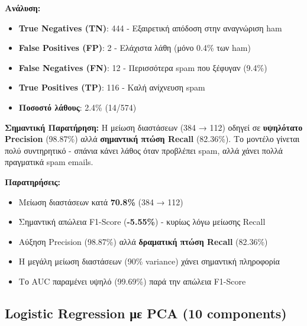\documentclass[12pt,a4paper,twoside]{book}
\begin{document}
\textbf{Ανάλυση:}
\begin{itemize}
    \item \textbf{True Negatives (TN)}: 444 - Εξαιρετική απόδοση στην αναγνώριση ham
    \item \textbf{False Positives (FP)}: 2 - Ελάχιστα λάθη (μόνο 0.4\% των ham)
    \item \textbf{False Negatives (FN)}: 12 - Περισσότερα spam που ξέφυγαν (9.4\%)
    \item \textbf{True Positives (TP)}: 116 - Καλή ανίχνευση spam
    \item \textbf{Ποσοστό λάθους}: 2.4\% (14/574)
\end{itemize}

\textbf{Σημαντική Παρατήρηση:} Η μείωση διαστάσεων (384 → 112) οδηγεί σε \textbf{υψηλότατο Precision} (98.87\%) αλλά \textbf{σημαντική πτώση Recall} (82.36\%). Το μοντέλο γίνεται πολύ συντηρητικό - σπάνια κάνει λάθος όταν προβλέπει spam, αλλά χάνει πολλά πραγματικά spam emails.

\textbf{Παρατηρήσεις:}
\begin{itemize}
    \item Μείωση διαστάσεων κατά \textbf{70.8\%} (384 → 112)
    \item Σημαντική απώλεια F1-Score (\textbf{-5.55\%}) - κυρίως λόγω μείωσης Recall
    \item Αύξηση Precision (98.87\%) αλλά \textbf{δραματική πτώση Recall} (82.36\%)
    \item Η μεγάλη μείωση διαστάσεων (90\% variance) χάνει σημαντική πληροφορία
    \item Το AUC παραμένει υψηλό (99.69\%) παρά την απώλεια F1-Score
\end{itemize}

\subsection{Logistic Regression με PCA (10 components)}
\end{document}
